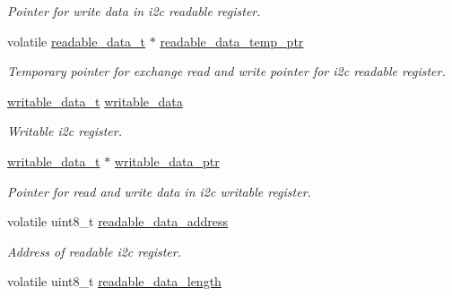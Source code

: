 \begin{DoxyCompactItemize}
\begin{DoxyCompactList}\small\item\em Pointer for write data in i2c readable register. \end{DoxyCompactList}\item 
\mbox{\label{i2c-rain_8h_ae8dc647e7272fabb6881c64f98b47a01}} 
volatile \hyperlink{structreadable__data__t}{readable\+\_\+data\+\_\+t} $\ast$ \hyperlink{i2c-rain_8h_ae8dc647e7272fabb6881c64f98b47a01}{readable\+\_\+data\+\_\+temp\+\_\+ptr}
\begin{DoxyCompactList}\small\item\em Temporary pointer for exchange read and write pointer for i2c readable register. \end{DoxyCompactList}\item 
\mbox{\label{i2c-rain_8h_a4ebae70bf7be3eb353c52c5b4104fca9}} 
\hyperlink{structwritable__data__t}{writable\+\_\+data\+\_\+t} \hyperlink{i2c-rain_8h_a4ebae70bf7be3eb353c52c5b4104fca9}{writable\+\_\+data}
\begin{DoxyCompactList}\small\item\em Writable i2c register. \end{DoxyCompactList}\item 
\mbox{\label{i2c-rain_8h_a69435b30022db229f79c9a67574008ec}} 
\hyperlink{structwritable__data__t}{writable\+\_\+data\+\_\+t} $\ast$ \hyperlink{i2c-rain_8h_a69435b30022db229f79c9a67574008ec}{writable\+\_\+data\+\_\+ptr}
\begin{DoxyCompactList}\small\item\em Pointer for read and write data in i2c writable register. \end{DoxyCompactList}\item 
\mbox{\label{i2c-rain_8h_ae75498e0d428e94dd8895abec0af11ca}} 
volatile uint8\+\_\+t \hyperlink{i2c-rain_8h_ae75498e0d428e94dd8895abec0af11ca}{readable\+\_\+data\+\_\+address}
\begin{DoxyCompactList}\small\item\em Address of readable i2c register. \end{DoxyCompactList}\item 
\mbox{\label{i2c-rain_8h_a202892f30149022049fb90b5db0ddbfa}} 
volatile uint8\+\_\+t \hyperlink{i2c-rain_8h_a202892f30149022049fb90b5db0ddbfa}{readable\+\_\+data\+\_\+length}

\end{DoxyCompactItemize}
